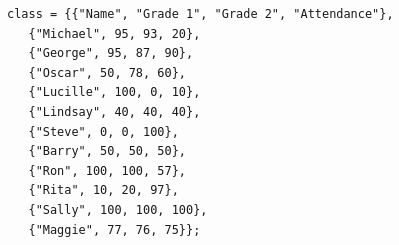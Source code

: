 \documentclass{article}
\begin{document}
\begin{verbatim}
class = {{"Name", "Grade 1", "Grade 2", "Attendance"},
   {"Michael", 95, 93, 20},
   {"George", 95, 87, 90},
   {"Oscar", 50, 78, 60},
   {"Lucille", 100, 0, 10},
   {"Lindsay", 40, 40, 40},
   {"Steve", 0, 0, 100},
   {"Barry", 50, 50, 50},
   {"Ron", 100, 100, 57},
   {"Rita", 10, 20, 97},
   {"Sally", 100, 100, 100},
   {"Maggie", 77, 76, 75}};
\end{verbatim}
\end{document}
